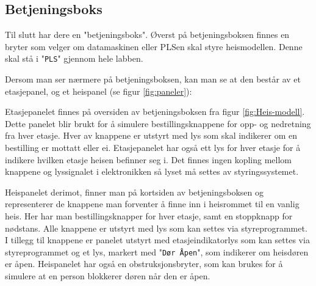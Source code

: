 \begin{alphasection}
\subsection{Betjeningsboks}
Til slutt har dere en "betjeningsboks". Øverst på betjeningsboksen finnes en bryter som velger om datamaskinen eller PLSen skal styre heismodellen. Denne skal stå i "\verb|PLS|" gjennom hele labben.



Dersom man ser nærmere på betjeningsboksen, kan man se at den består av et etasjepanel, og et heispanel (se figur \ref{fig:paneler}):

Etasjepanelet finnes på oversiden av betjeningsboksen fra figur \ref{fig:Heis-modell}. Dette panelet blir brukt for å simulere bestillingsknappene for opp- og nedretning fra hver etasje.  Hver av knappene er utstyrt med lys som skal indikerer om en bestilling er mottatt eller ei. Etasjepanelet har også ett lys for hver etasje for å indikere hvilken etasje heisen befinner seg i. Det finnes ingen kopling mellom knappene og lyssignalet i elektronikken så lyset må settes av styringssystemet.

Heispanelet derimot, finner man på kortsiden av betjeningsboksen og representerer de knappene man forventer å finne inn i heisrommet til en vanlig heis. Her har man bestillingsknapper for hver etasje, samt en stoppknapp for nødstans. Alle knappene er utstyrt med lys som kan settes via styreprogrammet. I tillegg til knappene er panelet utstyrt med etasjeindikatorlys som kan settes via styreprogrammet og et lys, markert med "\verb|Dør Åpen|", som indikerer om heisdøren er åpen. Heispanelet har også en obstruksjonsbryter, som kan brukes for å simulere at en person blokkerer døren når den er åpen.
\begin{figure}[ht!]
    \centering
    



\end{figure}
\end{alphasection}
